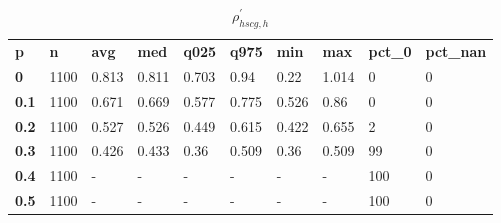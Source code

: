 \begin{table}[h]
 \centering 
\footnotesize
\caption{$\rho_{hscg,h}^\prime $}
\label{tab:alphahscgh}
\begin{tabular}[h]{| l l l l l l l l l l|
    } \hline
\textbf{ p} & \textbf{ n} & \textbf{ avg} & \textbf{ med} & \textbf{ q025} & \textbf{ q975} & \textbf{ min} & \textbf{ max} & \textbf{ pct\_0} & \textbf{ pct\_nan}
           \\
  \textbf{  0} & 1100 & 0.813 & 0.811 & 0.703 &  0.94 &  0.22 & 1.014 &   0 & 0
           \\
  \textbf{0.1} & 1100 & 0.671 & 0.669 & 0.577 & 0.775 & 0.526 &  0.86 &   0 & 0
           \\
  \textbf{0.2} & 1100 & 0.527 & 0.526 & 0.449 & 0.615 & 0.422 & 0.655 &   2 & 0
           \\
  \textbf{0.3} & 1100 & 0.426 & 0.433 &  0.36 & 0.509 &  0.36 & 0.509 &  99 & 0
           \\
  \textbf{0.4} & 1100 & - & - & - & - & - & - & 100 & 0
           \\
  \textbf{0.5} & 1100 & - & - & - & - & - & - & 100 & 0
           \\
 \hline \end{tabular}
 \end{table}
